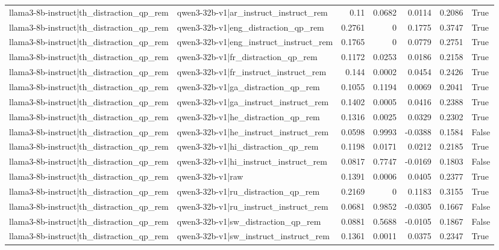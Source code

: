 \begin{table}
\begin{tabular}{l l r r r r l}
llama3-8b-instruct|th_distraction_qp_rem & qwen3-32b-v1|ar_instruct_instruct_rem & 0.11 & 0.0682 & 0.0114 & 0.2086 & True \\
llama3-8b-instruct|th_distraction_qp_rem & qwen3-32b-v1|eng_distraction_qp_rem & 0.2761 & 0 & 0.1775 & 0.3747 & True \\
llama3-8b-instruct|th_distraction_qp_rem & qwen3-32b-v1|eng_instruct_instruct_rem & 0.1765 & 0 & 0.0779 & 0.2751 & True \\
llama3-8b-instruct|th_distraction_qp_rem & qwen3-32b-v1|fr_distraction_qp_rem & 0.1172 & 0.0253 & 0.0186 & 0.2158 & True \\
llama3-8b-instruct|th_distraction_qp_rem & qwen3-32b-v1|fr_instruct_instruct_rem & 0.144 & 0.0002 & 0.0454 & 0.2426 & True \\
llama3-8b-instruct|th_distraction_qp_rem & qwen3-32b-v1|ga_distraction_qp_rem & 0.1055 & 0.1194 & 0.0069 & 0.2041 & True \\
llama3-8b-instruct|th_distraction_qp_rem & qwen3-32b-v1|ga_instruct_instruct_rem & 0.1402 & 0.0005 & 0.0416 & 0.2388 & True \\
llama3-8b-instruct|th_distraction_qp_rem & qwen3-32b-v1|he_distraction_qp_rem & 0.1316 & 0.0025 & 0.0329 & 0.2302 & True \\
llama3-8b-instruct|th_distraction_qp_rem & qwen3-32b-v1|he_instruct_instruct_rem & 0.0598 & 0.9993 & -0.0388 & 0.1584 & False \\
llama3-8b-instruct|th_distraction_qp_rem & qwen3-32b-v1|hi_distraction_qp_rem & 0.1198 & 0.0171 & 0.0212 & 0.2185 & True \\
llama3-8b-instruct|th_distraction_qp_rem & qwen3-32b-v1|hi_instruct_instruct_rem & 0.0817 & 0.7747 & -0.0169 & 0.1803 & False \\
llama3-8b-instruct|th_distraction_qp_rem & qwen3-32b-v1|raw & 0.1391 & 0.0006 & 0.0405 & 0.2377 & True \\
llama3-8b-instruct|th_distraction_qp_rem & qwen3-32b-v1|ru_distraction_qp_rem & 0.2169 & 0 & 0.1183 & 0.3155 & True \\
llama3-8b-instruct|th_distraction_qp_rem & qwen3-32b-v1|ru_instruct_instruct_rem & 0.0681 & 0.9852 & -0.0305 & 0.1667 & False \\
llama3-8b-instruct|th_distraction_qp_rem & qwen3-32b-v1|sw_distraction_qp_rem & 0.0881 & 0.5688 & -0.0105 & 0.1867 & False \\
llama3-8b-instruct|th_distraction_qp_rem & qwen3-32b-v1|sw_instruct_instruct_rem & 0.1361 & 0.0011 & 0.0375 & 0.2347 & True \\

\end{tabular}
\end{table}
